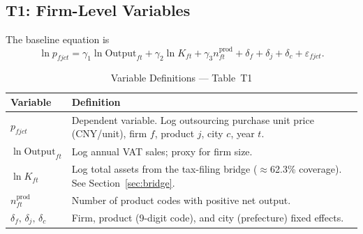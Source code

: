 \documentclass[12pt]{article}
\begin{document}
\bigskip

\subsection{T1: Firm-Level Variables}
\label{sec:t1}

The baseline equation is
\begin{equation}
  \ln p_{fjct}
  = \gamma_1 \ln \text{Output}_{ft}
  + \gamma_2 \ln K_{ft}
  + \gamma_3 n^{\text{prod}}_{ft}
  + \delta_f + \delta_j + \delta_c
  + \varepsilon_{fjct}.
  \label{eq:t1}
\end{equation}

\begin{table}[H]
  \centering
  \caption{Variable Definitions --- Table~T1}
  \label{tab:vardef_t1}
  \begin{tabular}{L{3.5cm} L{10.5cm}}
    \toprule
    Variable & Definition \\
    \midrule
    \(p_{fjct}\) &
      Dependent variable. Log outsourcing purchase unit price (CNY/unit),
      firm \(f\), product \(j\), city \(c\), year \(t\). \\[4pt]
    \(\ln \text{Output}_{ft}\) &
      Log annual VAT sales; proxy for firm size. \\[4pt]
    \(\ln K_{ft}\) &
      Log total assets from the tax-filing bridge (\(\approx\)62.3\%
      coverage). See Section~\ref{sec:bridge}. \\[4pt]
    \(n^{\text{prod}}_{ft}\) &
      Number of product codes with positive net output. \\[4pt]
    \(\delta_f,\,\delta_j,\,\delta_c\) &
      Firm, product (9-digit code), and city (prefecture) fixed effects. \\
    \bottomrule
  \end{tabular}
\end{table}
\end{document}
